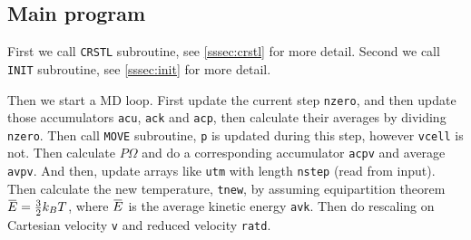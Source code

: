 
\subsection{Main program}

First we call \texttt{CRSTL} subroutine, see \ref{sssec:crstl} for more detail.
Second we call \texttt{INIT} subroutine, see \ref{sssec:init} for more detail.



Then we start a MD loop.
First update the current step \texttt{nzero}, and then update those
accumulators \texttt{acu}, \texttt{ack} and \texttt{acp}, then calculate
their averages by dividing \texttt{nzero}. Then call \texttt{MOVE} subroutine,
\texttt{p} is updated during this step, however \texttt{vcell} is not.
Then calculate $P \Omega$ and do a corresponding accumulator \texttt{acpv} and
average \texttt{avpv}. And then, update arrays like \texttt{utm} with length
\texttt{nstep} (read from input).
Then calculate the new temperature, \texttt{tnew}, by assuming equipartition
theorem $\mean{E} = \frac{ 3 }{ 2 } k_B T$, where $\mean{E}$ is
the average kinetic energy \texttt{avk}.
Then do rescaling on Cartesian velocity \texttt{v} and reduced velocity
\texttt{ratd}.

